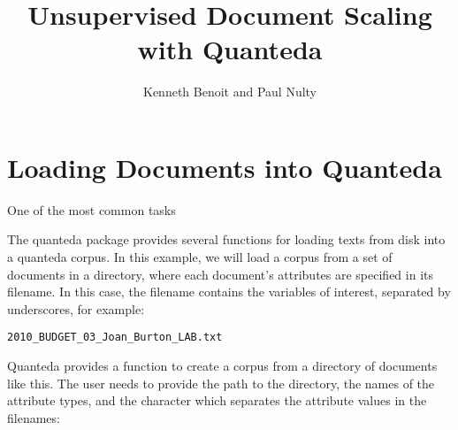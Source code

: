 \documentclass{article}
\begin{document}


\begin{Schunk}
\end{Schunk}


\title{Unsupervised Document Scaling with Quanteda}


\author{Kenneth Benoit and Paul Nulty}

\maketitle

\section*{Loading Documents into Quanteda}

One of the most common tasks 

The quanteda package provides several functions for loading texts from disk into a quanteda corpus. In this example, we will load a corpus from a set of documents in a directory, where each document's attributes are specified in its filename. In this case, the filename contains the variables of interest, separated by underscores, for example:

\texttt{2010\_BUDGET\_03\_Joan\_Burton\_LAB.txt}

Quanteda provides a function to create a corpus from a directory of documents like this. The user needs to provide the path to the directory, the names of the attribute types, and the character which separates the attribute values in the filenames:
\end{document}
